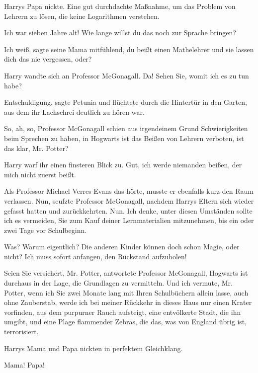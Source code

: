 Harrys Papa nickte. \glqq{}Eine gut durchdachte Maßnahme, um das Problem von
Lehrern zu lösen, die keine Logarithmen verstehen.\grqq{}

\glqq{}Ich war sieben Jahre alt! Wie lange willst du das noch zur Sprache
bringen?\grqq{}

\glqq{}Ich weiß\grqq{}, sagte seine Mama mitfühlend, \glqq{}du beißt einen
Mathelehrer und sie lassen dich das nie vergessen, oder?\grqq{}

Harry wandte sich an Professor McGonagall. \glqq{}Da! Sehen Sie, womit ich es zu
tun habe?\grqq{}

\glqq{}Entschuldigung\grqq{}, sagte Petunia und flüchtete durch die Hintertür in
den Garten, aus dem ihr Lachschrei deutlich zu hören war.

\glqq{}So, ah, so\grqq{}, Professor McGonagall schien aus irgendeinem Grund
Schwierigkeiten beim Sprechen zu haben, \glqq{}in Hogwarts ist das Beißen von
Lehrern verboten, ist das klar, Mr. Potter?\grqq{}

Harry warf ihr einen finsteren Blick zu. \glqq{}Gut, ich werde niemanden beißen,
der mich nicht zuerst beißt.\grqq{}

Als Professor Michael Verres-Evans das hörte, musste er ebenfalls kurz den Raum
verlassen. \glqq{}Nun\grqq{}, seufzte Professor McGonagall, nachdem Harrys
Eltern sich wieder gefasst hatten und zurückkehrten. \glqq{}Nun. Ich denke,
unter diesen Umständen sollte ich es vermeiden, Sie zum Kauf deiner
Lernmaterialien mitzunehmen, bis ein oder zwei Tage vor Schulbeginn.\grqq{}

\glqq{}Was? Warum eigentlich? Die anderen Kinder können doch schon Magie, oder
nicht? Ich muss sofort anfangen, den Rückstand aufzuholen!\grqq{}

\glqq{}Seien Sie versichert, Mr. Potter\grqq{}, antwortete Professor McGonagall,
\glqq{}Hogwarts ist durchaus in der Lage, die Grundlagen zu vermitteln. Und ich
vermute, Mr. Potter, wenn ich Sie zwei Monate lang mit Ihren Schulbüchern allein
lasse, auch ohne Zauberstab, werde ich bei meiner Rückkehr in dieses Haus nur
einen Krater vorfinden, aus dem purpurner Rauch aufsteigt, eine entvölkerte
Stadt, die ihn umgibt, und eine Plage flammender Zebras, die das, was von
England übrig ist, terrorisiert.\grqq{}

Harrys Mama und Papa nickten in perfektem Gleichklang.

\glqq{}Mama! Papa!\grqq{}